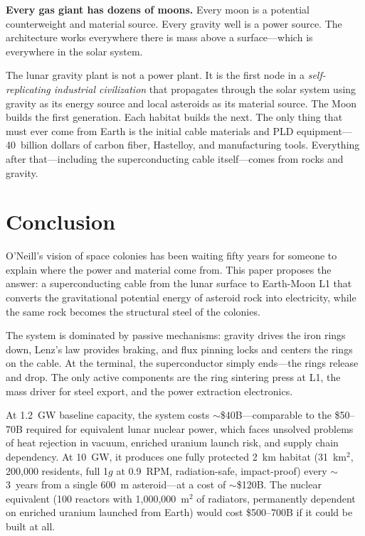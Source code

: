 \documentclass[12pt,letterpaper]{article}
\begin{document}
\textbf{Every gas giant has dozens of moons.} Every moon is a potential counterweight and material source. Every gravity well is a power source. The architecture works everywhere there is mass above a surface---which is everywhere in the solar system.

The lunar gravity plant is not a power plant. It is the first node in a \emph{self-replicating industrial civilization} that propagates through the solar system using gravity as its energy source and local asteroids as its material source. The Moon builds the first generation. Each habitat builds the next. The only thing that must ever come from Earth is the initial cable materials and PLD equipment---40~billion dollars of carbon fiber, Hastelloy, and manufacturing tools. Everything after that---including the superconducting cable itself---comes from rocks and gravity.

\section{Conclusion}

O'Neill's vision of space colonies has been waiting fifty years for someone to explain where the power and material come from. This paper proposes the answer: a superconducting cable from the lunar surface to Earth-Moon L1 that converts the gravitational potential energy of asteroid rock into electricity, while the same rock becomes the structural steel of the colonies.

The system is dominated by passive mechanisms: gravity drives the iron rings down, Lenz's law provides braking, and flux pinning locks and centers the rings on the cable. At the terminal, the superconductor simply ends---the rings release and drop. The only active components are the ring sintering press at L1, the mass driver for steel export, and the power extraction electronics.

At 1.2~GW baseline capacity, the system costs $\sim$\$40B---comparable to the \$50--70B required for equivalent lunar nuclear power, which faces unsolved problems of heat rejection in vacuum, enriched uranium launch risk, and supply chain dependency. At 10~GW, it produces one fully protected 2~km habitat (31~km$^2$, 200,000 residents, full 1$g$ at 0.9~RPM, radiation-safe, impact-proof) every $\sim$3~years from a single 600~m asteroid---at a cost of $\sim$\$120B. The nuclear equivalent (100 reactors with 1,000,000~m$^2$ of radiators, permanently dependent on enriched uranium launched from Earth) would cost \$500--700B if it could be built at all.
\end{document}
